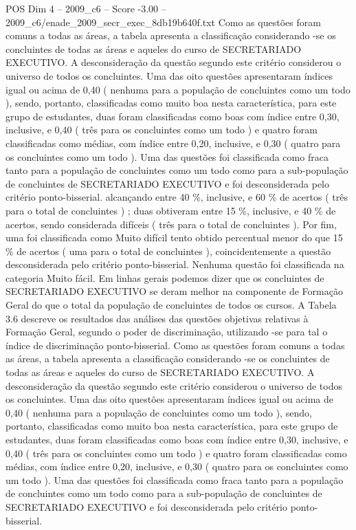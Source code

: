 \begin{textsample}{POS Dim 4 – 2009\_c6 – Score -3.00 – 2009\_c6/enade\_2009\_secr\_exec\_8db19b640f.txt}
Como as questões foram comuns a todas as áreas, a tabela apresenta a classificação considerando -se os concluintes de todas as áreas e aqueles do curso de SECRETARIADO EXECUTIVO.
A desconsideração da questão segundo este critério considerou o universo de todos os concluintes.
Uma das oito questões apresentaram índices igual ou acima de 0,40 ( nenhuma para a população de concluintes como um todo ), sendo, portanto, classificadas como muito boa nesta característica, para este grupo de estudantes, duas foram classificadas como boas com índice entre 0,30, inclusive, e 0,40 ( três para os concluintes como um todo ) e quatro foram classificadas como médias, com índice entre 0,20, inclusive, e 0,30 ( quatro para os concluintes como um todo ).
Uma das questões foi classificada como fraca tanto para a população de concluintes como um todo como para a sub-população de concluintes de SECRETARIADO EXECUTIVO e foi desconsiderada pelo critério ponto-bisserial. alcançando entre 40 \%, inclusive, e 60 \% de acertos ( três para o total de concluintes ) ; duas obtiveram entre 15 \%, inclusive, e 40 \% de acertos, sendo considerada difíceis ( três para o total de concluintes ).
Por fim, uma foi classificada como Muito difícil tento obtido percentual menor do que 15 \% de acertos ( uma para o total de concluintes ), coincidentemente a questão desconsiderada pelo critério ponto-bisserial.
Nenhuma questão foi classificada na categoria Muito fácil.
Em linhas gerais podemos dizer que os concluintes de SECRETARIADO EXECUTIVO se deram melhor na componente de Formação Geral do que o total da população de concluintes de todos os cursos.
A Tabela 3.6 descreve os resultados das análises das questões objetivas relativas à Formação Geral, segundo o poder de discriminação, utilizando -se para tal o índice de discriminação ponto-bisserial.
Como as questões foram comuns a todas as áreas, a tabela apresenta a classificação considerando -se os concluintes de todas as áreas e aqueles do curso de SECRETARIADO EXECUTIVO.
A desconsideração da questão segundo este critério considerou o universo de todos os concluintes.
Uma das oito questões apresentaram índices igual ou acima de 0,40 ( nenhuma para a população de concluintes como um todo ), sendo, portanto, classificadas como muito boa nesta característica, para este grupo de estudantes, duas foram classificadas como boas com índice entre 0,30, inclusive, e 0,40 ( três para os concluintes como um todo ) e quatro foram classificadas como médias, com índice entre 0,20, inclusive, e 0,30 ( quatro para os concluintes como um todo ).
Uma das questões foi classificada como fraca tanto para a população de concluintes como um todo como para a sub-população de concluintes de SECRETARIADO EXECUTIVO e foi desconsiderada pelo critério ponto-bisserial.

\end{textsample}
